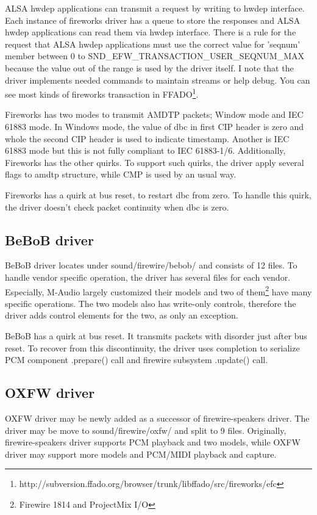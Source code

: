 \documentclass[onecolumn]{article}
\begin{document}
ALSA hwdep applications can transmit a request by writing to hwdep interface. Each instance of fireworks driver has a queue to store the responses and ALSA hwdep applications can read them via hwdep interface. There is a rule for the request that ALSA hwdep applications must use the correct value for 'seqnum' member between 0 to SND\_EFW\_TRANSACTION\_USER\_SEQNUM\_MAX because the value out of the range is used by the driver itself. I note that the driver implements needed commands to maintain streams or help debug. You can see most kinds of fireworks transaction in FFADO\footnote{http://subversion.ffado.org/browser/trunk/libffado/src/fireworks/efc}.

Fireworks has two modes to transmit AMDTP packets; Window mode and IEC 61883 mode. In Windows mode, the value of dbc in first CIP header is zero and whole the second CIP header is used to indicate timestamp. Another is IEC 61883 mode but this is not fully compliant to IEC 61883-1/6. Additionally, Fireworks has the other quirks. To support such quirks, the driver apply several flags to amdtp structure, while CMP is used by an usual way.

Fireworks has a quirk at bus reset, to restart dbc from zero. To handle this quirk, the driver doesn't check packet continuity when dbc is zero.

\subsection{BeBoB driver}

BeBoB driver locates under sound/firewire/bebob/ and consists of 12 files. To handle vendor specific operation, the driver has several files for each vendor. Especially, M-Audio largely customized their models and two of them\footnote{Firewire 1814 and ProjectMix I/O} have many specific operations. The two models also has write-only controls, therefore the driver adds control elements for the two, as only an exception.

BeBoB has a quirk at bus reset. It transmits packets with disorder just after bus reset. To recover from this discontinuity, the driver uses completion to serialize PCM component .prepare() call and firewire subsystem .update() call.

\subsection{OXFW driver}

OXFW driver may be newly added as a successor of firewire-speakers driver. The driver may be move to sound/firewire/oxfw/ and split to 9 files. Originally, firewire-speakers driver supports PCM playback and two models, while OXFW driver may support more models and PCM/MIDI playback and capture.
\end{document}
